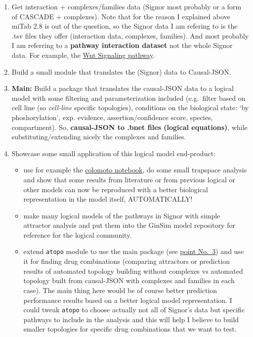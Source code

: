 \documentclass[
  12pt,
]{book}
\providecommand{\tightlist}{%
  \setlength{\itemsep}{0pt}\setlength{\parskip}{0pt}}
\begin{document}
\begin{enumerate}
\def\labelenumi{\arabic{enumi}.}
\item
  Get interaction + complexes/families data (Signor most probably or a form of CASCADE + complexes).
  Note that for the reason I explained above miTab 2.8 is out of the question, so the Signor data I am refering to is the .tsv files they offer (interaction data, complexes, families).
  And most probably I am referring to a \textbf{pathway interaction dataset} not the whole Signor data.
  For example, the \href{https://signor.uniroma2.it/pathway_browser.php?organism=human\&pathway_list=SIGNOR-WNT\&level=1}{Wnt Signaling pathway}.
\item
  Build a small module that translates the (Signor) data to Causal-JSON.
\item
  \hypertarget{causalJSONPoint3}{}

  \textbf{Main:} Build a package that translates the causal-JSON data to a logical model with some filtering and parameterization included (e.g.~filter based on cell line (so \emph{cell-line} specific topologies), conditions on the biological state: `by phoshorylation', exp. evidence, assertion/confidence score, species, compartment). So, \textbf{causal-JSON to .bnet files (logical equations)}, while substituting/extending nicely the complexes and families.
\item
  Showcase some small application of this logical model end-product:

  \begin{itemize}
  \tightlist
  \item
    use for example the \href{https://github.com/colomoto/colomoto-docker}{colomoto notebook}, do some small trapspace analysis and show that some results from literature or from previous logical or other models can now be reproduced with a better biological representation in the model itself, AUTOMATICALLY!
  \item
    make many logical models of the pathways in Signor with simple attractor analysis and put them into the GinSim model repository for reference for the logical community.
  \item
    extend \texttt{atopo} module to use the main package (see \protect\hyperlink{causalJSONPoint3}{point No.~3}) and use it for finding drug combinations (comparing attractors or prediction results of automated topology building without complexes vs automated topology built from causal-JSON with complexes and families in each case).
    The main thing here would be of course better prediction performance results based on a better logical model representation.
    I could tweak \texttt{atopo} to choose actually not all of Signor's data but specific pathways to include in the analysis and this will help I believe to build smaller topologies for specific drug combinations that we want to test.
  \end{itemize}
\end{enumerate}
\end{document}
